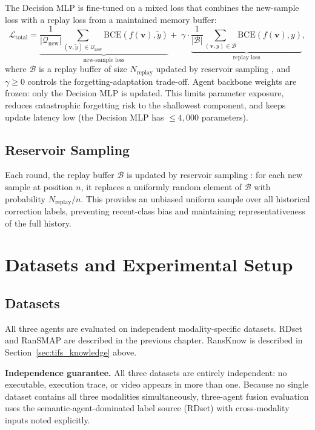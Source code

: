 The Decision MLP is fine-tuned on a mixed loss that combines the new-sample loss with a replay loss from a maintained memory buffer:
\begin{equation}
\mathcal{L}_\text{total} =
\underbrace{\frac{1}{|\mathcal{Q}_\text{new}|} \sum_{(\mathbf{v},\tilde{y}) \in \mathcal{Q}_\text{new}} \text{BCE}(f(\mathbf{v}), \tilde{y})}_{\text{new-sample loss}}
+\;\gamma \cdot
\underbrace{\frac{1}{|\mathcal{B}|} \sum_{(\mathbf{v},y) \in \mathcal{B}} \text{BCE}(f(\mathbf{v}), y)}_{\text{replay loss}},
\label{eq:tifs_feedbackloss}
\end{equation}
where $\mathcal{B}$ is a replay buffer of size $N_\text{replay}$ updated by reservoir sampling \cite{vitter1985random}, and $\gamma \geq 0$ controls the forgetting-adaptation trade-off. Agent backbone weights are frozen: only the Decision MLP is updated. This limits parameter exposure, reduces catastrophic forgetting risk to the shallowest component, and keeps update latency low (the Decision MLP has $\leq 4{,}000$ parameters).

\subsection{Reservoir Sampling}

Each round, the replay buffer $\mathcal{B}$ is updated by reservoir sampling \cite{vitter1985random}: for each new sample at position $n$, it replaces a uniformly random element of $\mathcal{B}$ with probability $N_\text{replay}/n$. This provides an unbiased uniform sample over all historical correction labels, preventing recent-class bias and maintaining representativeness of the full history.


\section{Datasets and Experimental Setup}
\label{sec:tifs_setup}

\subsection{Datasets}

All three agents are evaluated on independent modality-specific datasets. RDset and RanSMAP are described in the previous chapter. RansKnow is described in Section~\ref{sec:tifs_knowledge} above.

\textbf{Independence guarantee.} All three datasets are entirely independent: no executable, execution trace, or video appears in more than one. Because no single dataset contains all three modalities simultaneously, three-agent fusion evaluation uses the semantic-agent-dominated label source (RDset) with cross-modality inputs noted explicitly.


